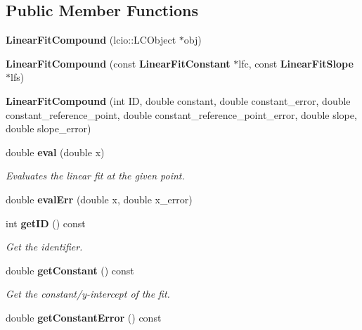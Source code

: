 \subsection*{Public Member Functions}
\begin{DoxyCompactItemize}
\item 
{\bfseries Linear\-Fit\-Compound} (lcio\-::\-L\-C\-Object $\ast$obj)\label{classCALICE_1_1LinearFitCompound_aa041bdcd07656d399c777cb69d3df568}

\item 
{\bfseries Linear\-Fit\-Compound} (const {\bf Linear\-Fit\-Constant} $\ast$lfc, const {\bf Linear\-Fit\-Slope} $\ast$lfs)\label{classCALICE_1_1LinearFitCompound_a8f5ac3c81a865ecc10f36e22bdb8e94f}

\item 
{\bfseries Linear\-Fit\-Compound} (int I\-D, double constant, double constant\-\_\-error, double constant\-\_\-reference\-\_\-point, double constant\-\_\-reference\-\_\-point\-\_\-error, double slope, double slope\-\_\-error)\label{classCALICE_1_1LinearFitCompound_aa9bea1b2c7c021daa57dc3542288c1ac}

\item 
double {\bf eval} (double x)
\begin{DoxyCompactList}\small\item\em Evaluates the linear fit at the given point. \end{DoxyCompactList}\item 
double {\bfseries eval\-Err} (double x, double x\-\_\-error)\label{classCALICE_1_1LinearFitCompound_a78b246859cb94fc056e66b65544f8d65}

\item 
int {\bf get\-I\-D} () const \label{classCALICE_1_1LinearFitCompound_a9cd94ca37460ca86c74fd4e659f280cc}

\begin{DoxyCompactList}\small\item\em Get the identifier. \end{DoxyCompactList}\item 
double {\bf get\-Constant} () const \label{classCALICE_1_1LinearFitCompound_ac1ca6ec7539fe980fbd67af7769930d3}

\begin{DoxyCompactList}\small\item\em Get the constant/y-\/intercept of the fit. \end{DoxyCompactList}\item 
double {\bf get\-Constant\-Error} () const \label{classCALICE_1_1LinearFitCompound_a1c512b13cee1df98953e18eff78047ac}


\end{DoxyCompactItemize}
